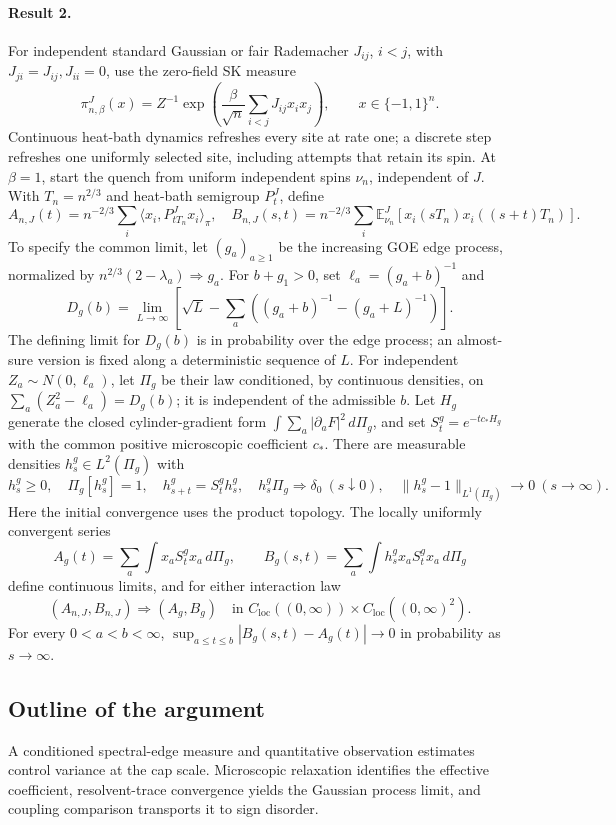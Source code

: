 \documentclass[11pt]{article}
\begin{document}
\paragraph{Result 2.} For independent standard Gaussian or fair Rademacher $J_{ij}$, $i<j$, with $J_{ji}=J_{ij},J_{ii}=0$, use the zero-field SK measure
\[
 \pi_{n,\beta}^J(x)=Z^{-1}\exp\left(\frac\beta{\sqrt n}\sum_{i<j}J_{ij}x_ix_j\right),\qquad x\in\{-1,1\}^n.
\]
Continuous heat-bath dynamics refreshes every site at rate one; a discrete step refreshes one uniformly selected site, including attempts that retain its spin. At $\beta=1$, start the quench from uniform independent spins $\nu_n$, independent of $J$. With $T_n=n^{2/3}$ and heat-bath semigroup $P_t^J$, define
\[
 A_{n,J}(t)=n^{-2/3}\sum_i\langle x_i,P_{tT_n}^Jx_i\rangle_\pi,\quad
 B_{n,J}(s,t)=n^{-2/3}\sum_i\mathbb E_{\nu_n}^J[x_i(sT_n)x_i((s+t)T_n)].
\]
To specify the common limit, let $(g_a)_{a\ge1}$ be the increasing GOE edge process, normalized by $n^{2/3}(2-\lambda_a)\Longrightarrow g_a$. For $b+g_1>0$, set $\ell_a=(g_a+b)^{-1}$ and
\[
 D_g(b)=\lim_{L\to\infty}\left[\sqrt L-\sum_a\left((g_a+b)^{-1}-(g_a+L)^{-1}\right)\right].
\]
The defining limit for $D_g(b)$ is in probability over the edge process; an almost-sure version is fixed along a deterministic sequence of $L$. For independent $Z_a\sim N(0,\ell_a)$, let $\Pi_g$ be their law conditioned, by continuous densities, on $\sum_a(Z_a^2-\ell_a)=D_g(b)$; it is independent of the admissible $b$. Let $H_g$ generate the closed cylinder-gradient form $\int\sum_a|\partial_aF|^2\,d\Pi_g$, and set $S_t^g=e^{-tc_*H_g}$ with the common positive microscopic coefficient $c_*$. There are measurable densities $h_s^g\in L^2(\Pi_g)$ with
\[
 h_s^g\ge0,\quad\Pi_g[h_s^g]=1,\quad h_{s+t}^g=S_t^gh_s^g,\quad
 h_s^g\Pi_g\Longrightarrow\delta_0\ (s\downarrow0),\quad
 \|h_s^g-1\|_{L^1(\Pi_g)}\to0\ (s\to\infty).
\]
Here the initial convergence uses the product topology. The locally uniformly convergent series
\[
 A_g(t)=\sum_a\int x_aS_t^gx_a\,d\Pi_g,\qquad
 B_g(s,t)=\sum_a\int h_s^gx_aS_t^gx_a\,d\Pi_g
\]
define continuous limits, and for either interaction law
\[
 (A_{n,J},B_{n,J})\Longrightarrow(A_g,B_g)
 \quad\text{in }C_{\mathrm{loc}}((0,\infty))\times C_{\mathrm{loc}}((0,\infty)^2).
\]
For every $0<a<b<\infty$, $\sup_{a\le t\le b}|B_g(s,t)-A_g(t)|\to0$ in probability as $s\to\infty$.

\subsection{Outline of the argument}
A conditioned spectral-edge measure and quantitative observation estimates control variance at the cap scale. Microscopic relaxation identifies the effective coefficient, resolvent-trace convergence yields the Gaussian process limit, and coupling comparison transports it to sign disorder.
\end{document}
